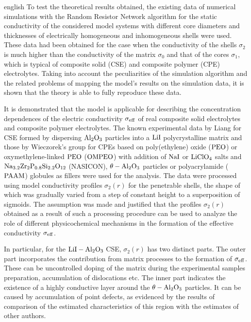 \begin{otherlanguage*}{english}
To test the theoretical results obtained, the existing data of numerical simulations with the Random Resistor Network algorithm for the static conductivity of the considered model systems with different core diameters and thicknesses of electrically homogeneous and inhomogeneous shells were used. These data had been obtained for the case when the conductivity of the shells $ \sigma_2 $ is much higher than the conductivity of the matrix $ \sigma_0 $ and that of the cores $ \sigma_1 $, which is typical of composite solid (CSE) and composite polymer  (CPE) electrolytes.
Taking into account the peculiarities of the simulation algorithm  and the related problems of mapping the model's results on the simulation data, it is shown that the theory is able to fully reproduce these data.

It is demonstrated that the model is applicable for describing the concentration dependences of the electric conductivity $ \sigma_ {\rm eff} $ of real  composite solid electrolytes and composite  polymer electrolytes.
The known experimental data by Liang for CSE formed by dispersing  $ \rm Al_2O_3 $ particles into a  $ \rm LiI $ polycrystalline matrix and those by Wieczorek's group for CPEs based on poly(ethylene) oxide ($ \rm PEO $) or oxymethylene-linked  $ \rm PEO $ ($ \rm OMPEO $) with addition of $ \rm NaI $ or $ \rm LiClO_4 $ salts and $ \rm Na_ {3.2} Zr_2P_ {0.8} Si_ { 2.2} O_ {12} $ (NASICON), $ \rm \theta-Al_2O_3 $ particles  or polyacrylamide ($ \rm PAAM $) globules as fillers  were used for the analysis.
The data were processed using model conductivity profiles $ \sigma_2 (r) $ for the penetrable shells, the shape of which was gradually varied from a step of constant height to a superposition of sigmoids.
The assumption was made and justified that the profiles $ \sigma_2 (r) $ obtained as a result of such a processing procedure can be used to analyze the role of different physicochemical mechanisms in the formation of the effective conductivity $ \sigma_ {\rm eff} $.

In particular, for the $ \rm LiI-Al_2O_3 $ CSE, $ \sigma_2 (r) $ has two  distinct parts. The outer part incorporates the contribution from matrix processes to the formation of $ \sigma _ {\rm eff} $. These can be uncontrolled doping of the matrix during the  experimental samples preparation, accumulation of dislocations etc. The inner part indicates the existence of a highly conductive layer around the $ \rm \theta-Al_2O_3 $ particles. It can be caused by accumulation of point defects, as evidenced by the results of comparison of the estimated characteristics of this region with the estimates of other authors.


\end{otherlanguage*}
